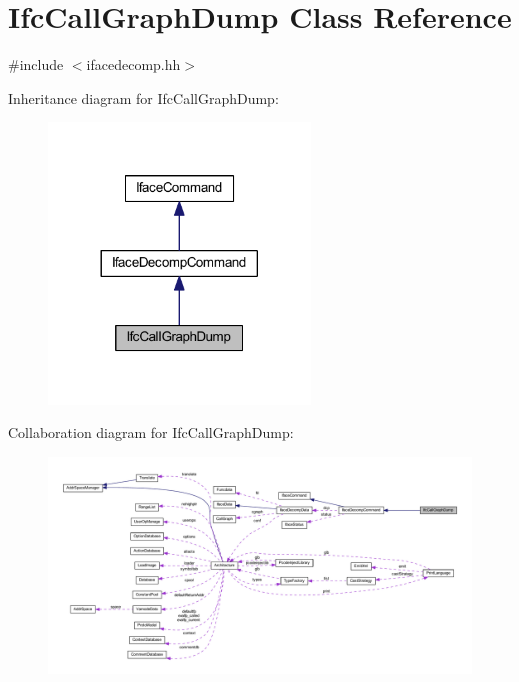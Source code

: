 \hypertarget{class_ifc_call_graph_dump}{}\section{Ifc\+Call\+Graph\+Dump Class Reference}
\label{class_ifc_call_graph_dump}


{\ttfamily \#include $<$ifacedecomp.\+hh$>$}



Inheritance diagram for Ifc\+Call\+Graph\+Dump\+:
\nopagebreak
\begin{figure}[H]
\begin{center}
\leavevmode
\includegraphics[width=197pt]{class_ifc_call_graph_dump__inherit__graph}
\end{center}
\end{figure}


Collaboration diagram for Ifc\+Call\+Graph\+Dump\+:
\nopagebreak
\begin{figure}[H]
\begin{center}
\leavevmode
\includegraphics[width=350pt]{class_ifc_call_graph_dump__coll__graph}
\end{center}
\end{figure}
